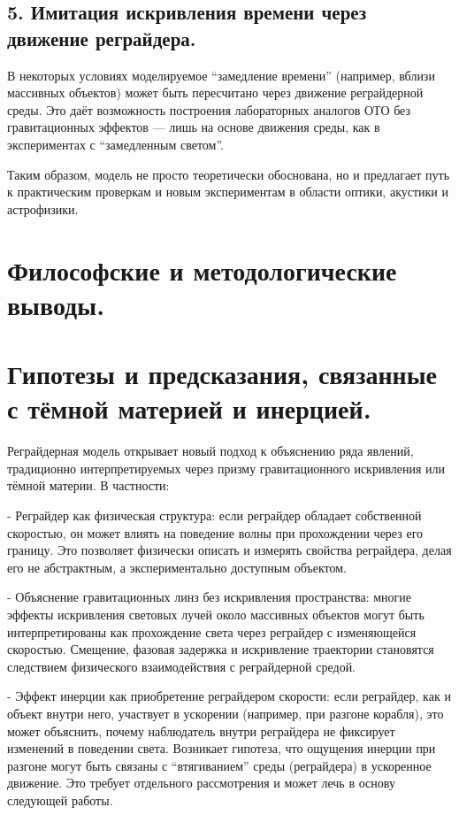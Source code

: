 \documentclass[12pt]{article}
\begin{document}
\subsection*{5. Имитация искривления времени через движение реграйдера.}
В некоторых условиях моделируемое “замедление времени” (например, вблизи массивных объектов) может быть пересчитано через движение реграйдерной среды. Это даёт возможность построения лабораторных аналогов ОТО без гравитационных эффектов — лишь на основе движения среды, как в экспериментах с “замедленным светом”.

Таким образом, модель не просто теоретически обоснована, но и предлагает путь к практическим проверкам и новым экспериментам в области оптики, акустики и астрофизики.

\section*{Философские и методологические выводы.}
\section*{Гипотезы и предсказания, связанные с тёмной материей и инерцией.}


Реграйдерная модель открывает новый подход к объяснению ряда явлений, традиционно интерпретируемых через призму гравитационного искривления или тёмной материи. В частности:

- Реграйдер как физическая структура: если реграйдер обладает собственной скоростью, он может влиять на поведение волны при прохождении через его границу. Это позволяет физически описать и измерять свойства реграйдера, делая его не абстрактным, а экспериментально доступным объектом.

- Объяснение гравитационных линз без искривления пространства: многие эффекты искривления световых лучей около массивных объектов могут быть интерпретированы как прохождение света через реграйдер с изменяющейся скоростью. Смещение, фазовая задержка и искривление траектории становятся следствием физического взаимодействия с реграйдерной средой.

- Эффект инерции как приобретение реграйдером скорости: если реграйдер, как и объект внутри него, участвует в ускорении (например, при разгоне корабля), это может объяснить, почему наблюдатель внутри реграйдера не фиксирует изменений в поведении света. Возникает гипотеза, что ощущения инерции при разгоне могут быть связаны с “втягиванием” среды (реграйдера) в ускоренное движение. Это требует отдельного рассмотрения и может лечь в основу следующей работы.
\end{document}
